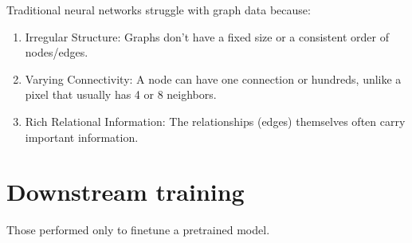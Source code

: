 Traditional neural networks struggle with graph data because:
\begin{enumerate}
\item Irregular Structure: Graphs don't have a fixed size or a
  consistent order of nodes/edges.
\item Varying Connectivity: A node can have one connection or
  hundreds, unlike a pixel that usually has 4 or 8 neighbors.
\item Rich Relational Information: The relationships (edges)
  themselves often carry important information.
\end{enumerate}

\section{Downstream training}
Those performed only to finetune a pretrained model.
